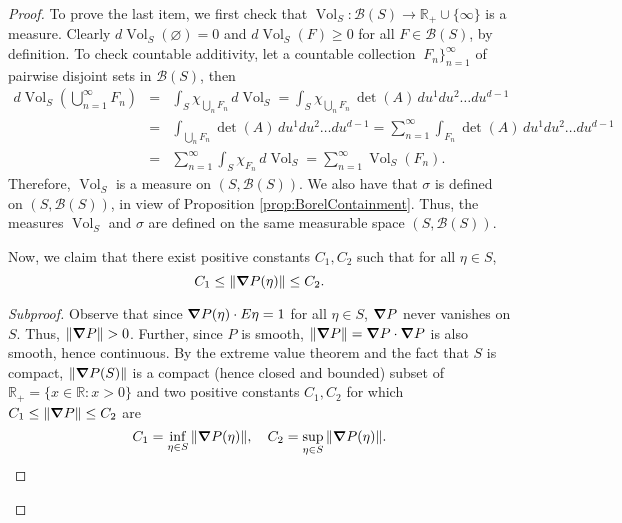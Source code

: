\documentclass{article}
\renewcommand\det{\operatorname{det}}
\newcommand{\R}{\mathbb{R}}
\newcommand{\lp}{\left(}
\newcommand{\rp}{\right)}
\theoremstyle{theorem}
\newcommand*{\myproofname}{Proof}
\newenvironment{subproof}[1][\myproofname]{\begin{proof}[#1]\renewcommand*{\qedsymbol}{$\mathbin{/\mkern-6mu/}$}}{\end{proof}}
\newcommand{\Vol}{\operatorname{Vol}}
\begin{document}
\begin{proof}
To prove the last item, we first check that $\Vol_S: \mathcal{B}(S) \to \R_+\cup\{ \infty \}$ is a measure. Clearly $d\Vol_S(\varnothing) = 0$ and $d\Vol_S(F) \geq 0$ for all $F\in \mathcal{B}(S)$, by definition. To check countable additivity, let a countable collection $\ F_n \}_{n=1}^\infty$ of pairwise disjoint sets in $\mathcal{B}(S)$, then 
\begin{eqnarray*}
    d\Vol_S\lp \bigcup_{n=1}^\infty  F_n\rp &=& \int_{S} \chi_{\bigcup_n F_n}\,d\Vol_S 
    =\int_{S} \chi_{\bigcup_n F_n}\,\det(A)\, du^1du^2 \dots du^{d-1} \\
    &=& \int_{\bigcup_n F_n}\det(A)\,du^1du^2 \dots du^{d-1}
    = \sum^\infty_{n=1} \int_{F_n}\det(A)\,du^1du^2 \dots du^{d-1}\\
    &=& \sum^\infty_{n=1}\int_S \chi_{F_n} \,d\Vol_S = \sum^\infty_{n=1} \Vol_S(F_n).
\end{eqnarray*}
Therefore, $\Vol_S$ is a measure on $(S,\mathcal{B}(S))$. We also have that $\sigma$ is defined on $(S,\mathcal{B}(S))$, in view of Proposition \ref{prop:BorelContainment}. Thus, the measures $\Vol_S$ and $\sigma$ are defined on the same measurable space $(S,\mathcal{B}(S))$. 


Now, we claim that there exist positive constants $C_1, C_2$ such that for all $\eta\in S$, 
\begin{equation*}
    C_1 \leq \norm{\grad P(\eta)} \leq C_2.
\end{equation*}
\begin{subproof}[Subproof]
Observe that since $\grad P(\eta) \cdot E\eta = 1$ for all $\eta\in S$, $\grad P$ never vanishes on $S$. Thus, $\norm{\grad P} > 0$. Further, since $P$ is smooth, $\norm{\grad P} = \grad P \cdot \grad P$ is also smooth, hence continuous. By the extreme value theorem and the fact that $S$ is compact, $\norm{\grad P(S) }$ is a compact (hence closed and bounded) subset of $\R_+ = \{ x \in \R : x > 0 \}$ and two positive constants $C_1,C_2$ for which $C_1 \leq \norm{\grad P} \leq C_2$ are
\begin{equation*}
    C_1 = \inf_{\eta\in S}\norm{\grad P(\eta) }, \quad C_2 = \sup_{\eta\in S}\norm{\grad P(\eta) }.
\end{equation*}
\end{subproof}


\end{proof}
\end{document}
